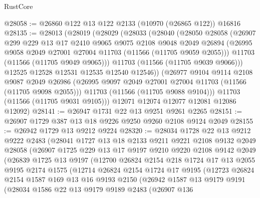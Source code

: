 \begin{lexlean}{RustCore}
\begin{coremodule}
@28058 := @26860 @122 @13 @122 @2133 (@10970 (@26865 @122)) @16816
@28135 := @28013
    (@28019
      (@28029
        (@28033
          (@28040
            (@28050
              @28058
              (@26907
                @299
                @229
                @13
                @17
                @2410
                @9065
                @9075
                @2108
                @9048
                @2049
                @26894
                (@26995 @9058 @2049 @27001 @27004 @11703 (@11566 (@11705 @9059 @2055)))
                @11703
                (@11566 (@11705 @9049 @9065)))
              @11703
              (@11566 (@11705 @9039 @9066)))
            @12525
            @12528
            @12531
            @12535
            @12540
            @12546))
        (@26977
          @9104
          @9114
          @2108
          @9087
          @2049
          @26986
          (@26995 @9097 @2049 @27001 @27004 @11703 (@11566 (@11705 @9098 @2055)))
          @11703
          (@11566 (@11705 @9088 @9104)))
        @11703
        (@11566 (@11705 @9031 @9105)))
      @12071
      @12074
      @12077
      @12081
      @12086
      @12092)
@28141 := @26947 @1731 @22 @13 @9251 @9261 @2265
@28151 := @26907 @1729 @387 @13 @18 @9226 @9250 @9260 @2108 @9124 @2049
@28155 := @26942 @1729 @13 @9212 @9224
@28320 := @28034
    @1728
    @22
    @13
    @9212
    @9222
    @2483
    (@28041
      @1727
      @13
      @18
      @2133
      @9211
      @9221
      @2108
      @9132
      @2049
      @28058
      (@26907
        @1725
        @229
        @13
        @17
        @9197
        @9210
        @9220
        @2108
        @9142
        @2049
        (@26839
          @1725
          @13
          @9197
          (@12700
            @26824
            @2154
            @218
            @1724
            @17
            @13
            @2055
            @9195
            @2174
            @1575
            (@12714
              @26824
              @2154
              @1724
              @17
              @9195
              (@12723
                @26824
                @2154
                @1587
                @169
                @13
                @16
                @9193
                @2150
                (@26942
                  @1587
                  @13
                  @9179
                  @9191
                  (@28034
                    @1586
                    @22
                    @13
                    @9179
                    @9189
                    @2483
                    (@26907
                      @136

\end{coremodule}
\end{lexlean}
